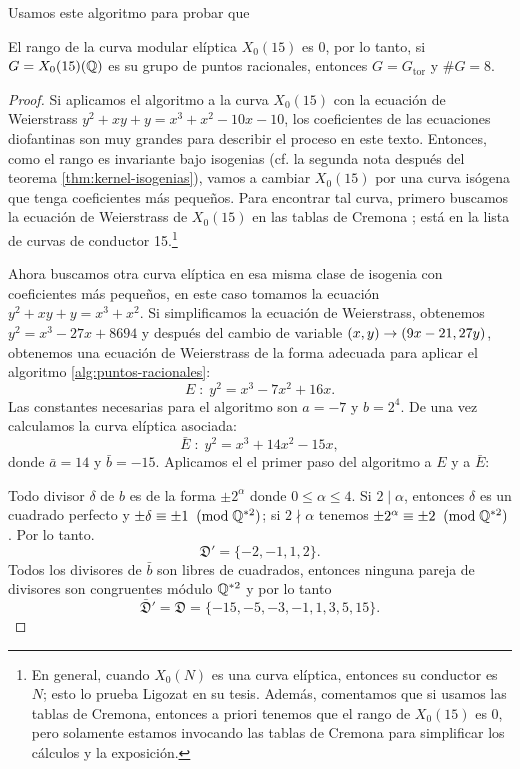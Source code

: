 Usamos este algoritmo para probar que

\begin{prop}\label{prop:rango-X015}
  El rango de la curva modular elíptica $X_0(15)$ es 0, por lo tanto, si $G=X_0(15)(\mathbb{Q})$ es su grupo de puntos racionales, entonces $G=G_\mathrm{tor}$ y $\# G=8$.
\end{prop}

\begin{proof}
	Si aplicamos el algoritmo a la curva $X_0(15)$ con la ecuación de Weierstrass $y^2+xy+y=x^3+x^2-10x-10$, los coeficientes de las ecuaciones diofantinas son muy grandes para describir el proceso en este texto. Entonces, como el rango es invariante bajo isogenias (cf. la segunda nota después del teorema \ref{thm:kernel-isogenias}), vamos a cambiar $X_0(15)$ por una curva isógena que tenga coeficientes más pequeños. Para encontrar tal curva, primero buscamos la ecuación de Weierstrass de $X_0(15)$ en las tablas de Cremona \cite{Cremona}; está en la lista de curvas de conductor 15.\footnote{En general, cuando $X_0(N)$ es una curva elíptica, entonces su conductor es $N$; esto lo prueba Ligozat en su tesis. Además, comentamos que si usamos las tablas de Cremona, entonces a priori tenemos que el rango de $X_0(15)$ es 0, pero solamente estamos invocando las tablas de Cremona para simplificar los cálculos y la exposición.}
	
	Ahora buscamos otra curva elíptica en esa misma clase de isogenia con coeficientes más pequeños, en este caso tomamos la ecuación $y^2+xy+y= x^3+x^2$. Si simplificamos la ecuación de Weierstrass, obtenemos $y^2=x^3-27x+8694$ y después del cambio de variable $(x,y)\rightarrow (9x-21,27y)$, obtenemos una ecuación de Weierstrass de la forma adecuada para aplicar el algoritmo \ref{alg:puntos-racionales}:
\[
	E\; : \; y^2=x^3-7x^2+16x.
\]
Las constantes necesarias para el algoritmo son $a=-7$ y $b=2^4$. De una vez calculamos la curva elíptica asociada:
\[
	\bar{E}\; :\; y^2=x^3+14x^2-15x,
\]
donde $\bar{a}=14$ y $\bar{b}=-15$. Aplicamos el el primer paso del algoritmo a $E$ y a $\bar{E}$:

Todo divisor $\delta$ de $b$ es de la forma $\pm 2^\alpha$ donde $0\leq\alpha\leq4$. Si $2\mid\alpha$, entonces $\delta$ es un cuadrado perfecto y $\pm\delta\equiv\pm1\;\;(\mathrm{mod}\; \mathbb{Q}^{*2})$; si $2\nmid\alpha$ tenemos $\pm 2^\alpha\equiv\pm 2\;\;(\mathrm{mod}\; \mathbb{Q}^{*2})$. Por lo tanto.
\[
	\mathfrak{D}'=\{-2,-1,1,2\}.
\]
Todos los divisores de $\bar{b}$ son libres de cuadrados, entonces ninguna pareja de divisores son congruentes módulo $\mathbb{Q}^{*2}$ y por lo tanto
\[
	\bar{\mathfrak{D}}'=\mathfrak{D}=\{-15,-5,-3,-1,1,3,5,15\}.
\]


\end{proof}

